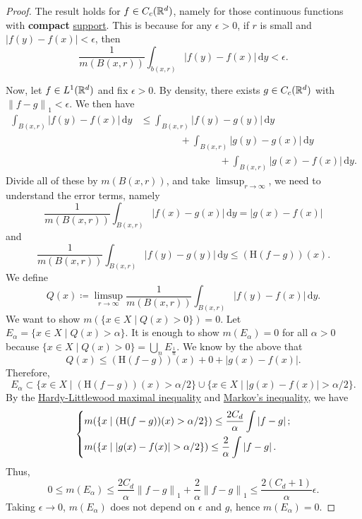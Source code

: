 \begin{proof}
	The result holds for \(f\in C_c(\mathbb{\MakeUppercase{r}} ^d)\), namely for those continuous functions with \textbf{compact} \hyperref[def:support]{support}.
	This is because for any \(\epsilon >0\), if \(r\) is small and \(\left\vert f(y) - f(x) \right\vert < \epsilon \), then
	\[
		\frac{1}{m(B(x, r))}\int _{b(x, r)}\left\vert f(y) - f(x) \right\vert \,\mathrm{d} y < \epsilon .
	\]

	Now, let \(f\in L^1(\mathbb{\MakeUppercase{r}} ^d)\) and fix \(\epsilon >0\). By density, there exists \(g\in C_c(\mathbb{\MakeUppercase{r}} ^d)\) with \(\left\lVert f-g\right\rVert _1<\epsilon \).
	We then have
	\[
		\begin{split}
			\int_{B(x, r)}\left\vert f(y) - f(x) \right\vert \,\mathrm{d} y
			&\leq \int _{B(x, r)}\left\vert f(y) - g(y) \right\vert \,\mathrm{d} y\\
			&\qquad\qquad+\int _{B(x, r)}\left\vert g(y) - g(x) \right\vert \,\mathrm{d} y \\
			&\qquad\qquad\qquad\qquad+\int _{B(x, r)}\left\vert g(x) - f(x) \right\vert \,\mathrm{d} y.
		\end{split}
	\]
	Divide all of these by \(m(B(x, r))\), and take \(\limsup_{r \to \infty} \), we need to understand the error terms, namely
	\[
		\frac{1}{m(B(x, r))}\int _{B(x, r)}\left\vert f(x) - g(x) \right\vert \,\mathrm{d} y = \left\vert g(x) - f(x) \right\vert
	\]
	and
	\[
		\frac{1}{m(B(x, r))}\int _{B(x, r)}\left\vert f(y) - g(y) \right\vert \,\mathrm{d} y \leq (\mathrm{H} (f-g))(x).
	\]
	We define
	\[
		Q(x) \coloneqq \limsup_{r \to \infty} \frac{1}{m(B(x, r))}\int _{B(x, r)} \left\vert f(y) - f(x) \right\vert \,\mathrm{d} y.
	\]
	We want to show \(m(\{x\in X\mid Q(x) > 0\}) = 0\). Let \(E_\alpha = \{x\in X\mid Q(x) > \alpha \}\). It is enough to show \(m(E_\alpha ) = 0\)
	for all \(\alpha >0\) because \(\{x\in X\mid Q(x)> 0\}= \bigcup_n E_{\frac{1}{n}}\). We know by the above that
	\[
		Q(x) \leq (\mathrm{H} (f-g))(x) + 0 + \left\vert g(x) - f(x) \right\vert.
	\]
	Therefore,
	\[
		E_\alpha \subset \{x\in X\mid (\mathrm{H} (f-g))(x) > \alpha /2\}\cup \{x\in X\mid \left\vert g(x) - f(x) \right\vert >\alpha /2\}.
	\]
	By the \hyperref[thm:HL-maximal-inequality]{Hardy-Littlewood maximal inequality} and \hyperref[lma:Markov-inequality]{Markov's inequality}, we have
	\[
		\begin{dcases}
			m(\left\{x\mid (\mathrm{H}(f-g))(x) > \alpha / 2\right\})                \leq \frac{2C_{d} }{\alpha }\int \left\vert f - g \right\vert; \\
			m(\left\{x\mid \left\vert g(x) - f(x) \right\vert > \alpha / 2\right\})  \leq \frac{2}{\alpha }\int \left\vert f - g \right\vert.
		\end{dcases}
	\]
	Thus,
	\[
		0\leq m(E_\alpha )\leq \frac{2C_d}{\alpha }\left\lVert f-g\right\rVert _1 + \frac{2}{\alpha }\left\lVert f-g\right\rVert _1 \leq \frac{2(C_{d} +1)}{\alpha }\epsilon.
	\]
	Taking \(\epsilon \to 0\), \(m(E_\alpha )\) does not depend on \(\epsilon \) and \(g\), hence \(m(E_\alpha) = 0\).
\end{proof}
